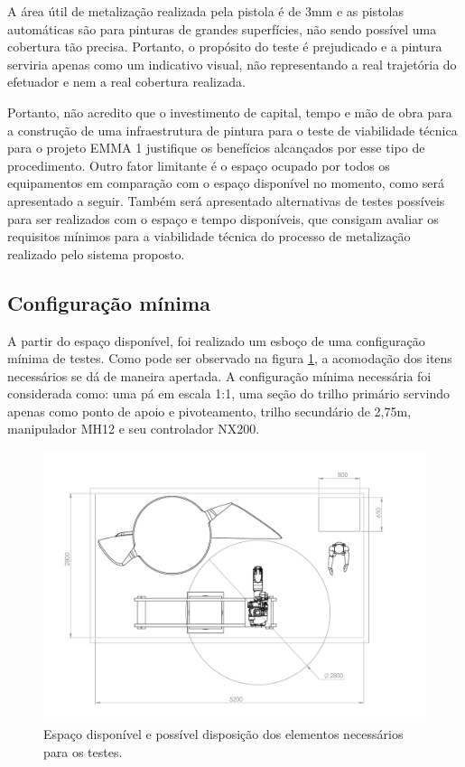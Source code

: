A área útil de metalização realizada pela pistola é de 3mm e as pistolas automáticas são para pinturas de grandes 
superfícies, não sendo possível uma cobertura tão precisa. Portanto, o propósito
do teste é prejudicado e a pintura serviria apenas como um indicativo visual,
não representando a real trajetória do efetuador e nem a real cobertura
realizada.

Portanto, não acredito que o investimento de capital, tempo e mão de obra para a construção de uma infraestrutura 
de pintura para o teste de viabilidade técnica para o projeto EMMA 1 justifique os benefícios alcançados por esse 
tipo de procedimento. Outro fator limitante é o espaço ocupado por todos os equipamentos em comparação com o 
espaço disponível no momento, como será apresentado a seguir. Também será apresentado alternativas de testes 
possíveis para ser realizados com o espaço e tempo disponíveis, que consigam avaliar os requisitos mínimos para 
a viabilidade técnica do processo de metalização realizado pelo sistema proposto.  

\subsection{Configuração mínima}

A partir do espaço disponível, foi realizado um esboço de uma configuração
mínima de testes. Como pode ser observado na figura \ref{fig::planta}, a
acomodação dos itens necessários se dá de maneira apertada. A
configuração mínima necessária foi considerada como: uma pá em escala 1:1, uma
seção do trilho primário servindo apenas como ponto de apoio e pivoteamento,
trilho secundário de 2,75m, manipulador MH12 e seu controlador NX200.

\begin{figure}[h!]
\centering
	\includegraphics[width=0.9\columnwidth]{figs/espaco/Montagem_Base_LEAD}
	\caption{Espaço disponível e possível disposição dos elementos necessários
	para os testes.}
	\label{fig::planta}
\end{figure}


